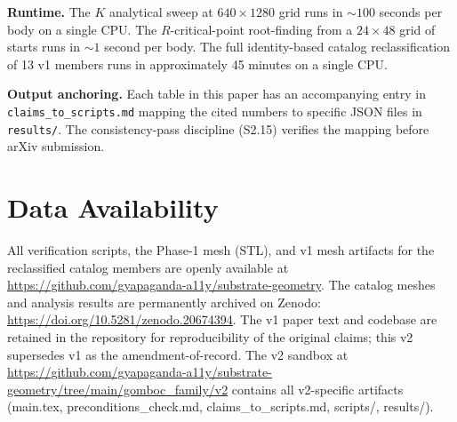 \documentclass[11pt,a4paper]{article}
\begin{document}
\textbf{Runtime.} The $K$ analytical sweep at $640 \times 1280$ grid
runs in $\sim 100$ seconds per body on a single CPU. The
$R$-critical-point root-finding from a $24 \times 48$ grid of starts
runs in $\sim 1$ second per body. The full identity-based catalog
reclassification of 13 v1 members runs in approximately 45 minutes
on a single CPU.

\textbf{Output anchoring.} Each table in this paper has an
accompanying entry in \texttt{claims\_to\_scripts.md} mapping the
cited numbers to specific JSON files in \texttt{results/}. The
consistency-pass discipline (S2.15) verifies the mapping before
arXiv submission.

\section{Data Availability}

All verification scripts, the Phase-1 mesh (STL), and v1 mesh
artifacts for the reclassified catalog members are openly available
at \url{https://github.com/gyapaganda-a11y/substrate-geometry}.
The catalog meshes and analysis results are permanently archived on
Zenodo: \url{https://doi.org/10.5281/zenodo.20674394}.
The v1 paper text and codebase are retained in the repository for
reproducibility of the original claims; this v2 supersedes v1 as the
amendment-of-record. The v2 sandbox at
\url{https://github.com/gyapaganda-a11y/substrate-geometry/tree/main/gomboc_family/v2}
contains all v2-specific artifacts (main.tex, preconditions\_check.md,
claims\_to\_scripts.md, scripts/, results/).
\end{document}
